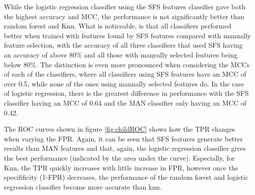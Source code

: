 While the logistic regression classifier using the SFS features classifier gave both the highest accuracy and MCC, the performance is not significantly better than random forest and Knn. What is noticeable, is that all classifiers performed better when trained with features found by SFS features compared with manually feature selection, with the accuracy of all three classifiers that used SFS having an accuracy of above 80\% and all those with manyally selected features being below 80\%. The distinction is even more pronounced when considering the MCCs of each of the classifiers, where all classifiers using SFS features have an MCC of over 0.5, while none of the ones using manually selected features do. In the case of logistic regression, there is the greatest difference in performance with the SFS classifier having an MCC of 0.64 and the MAN classifier only having an MCC of 0.42. 

%
\childMat

\childROC
The ROC curves shown in figure \ref{fig:childROC} shows how the TPR changes when varying the FPR. Again, it can be seen that SFS features generate better results than MAN features and that, again, the logistic regression classifier gives the best performance (indicated by the area under the curve). Especially, for Knn, the TPR quickly increases with little increase in FPR, however once the specifificity (1-FPR) decreases, the performance of the random forest and logistic regression classifier become more accurate than knn.
\childResults
